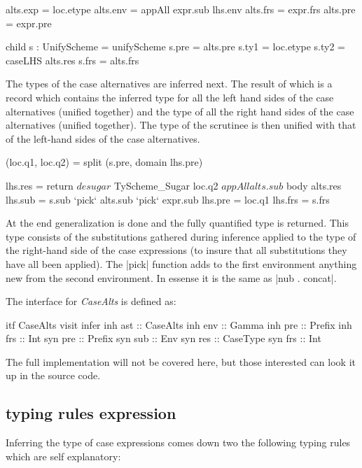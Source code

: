 \begin{code}
   alts.exp  = loc.etype
   alts.env  = appAll expr.sub lhs.env
   alts.frs  = expr.frs
   alts.pre  = expr.pre
   
   child s : UnifyScheme = unifyScheme
   s.pre  = alts.pre
   s.ty1  = loc.etype
   s.ty2  = caseLHS alts.res
   s.frs  = alts.frs
\end{code}

The types of the case alternatives are inferred next. The result of which is a record which contains the inferred type for all the left hand sides of the case alternatives (unified together) and the type of all the right hand sides of the case alternatives (unified together). The type of the scrutinee is then unified with that of the left-hand sides of the case alternatives.

\begin{code}       
   (loc.q1, loc.q2) = split (s.pre, domain lhs.pre)
   
   lhs.res = return  $ desugar 
                     $ TyScheme_Sugar loc.q2 
                     $ appAll alts.sub 
                     $ body alts.res
   lhs.sub  = s.sub `pick` alts.sub `pick` expr.sub
   lhs.pre  = loc.q1
   lhs.frs  = s.frs
\end{code}
At the end generalization is done and the fully quantified type is returned. This type consists of the substitutions gathered during inference applied to the type of the right-hand side of the case expressions (to insure that all substitutions they have all been applied). The |pick| function adds to the first environment anything new from the second environment. In essense it is the same as |nub . concat|.

The interface for \emph{CaseAlts} is defined as:
\begin{code}
itf CaseAlts
  visit infer
    inh ast  :: CaseAlts
    inh env  :: Gamma
    inh pre  :: Prefix
    inh frs  :: Int
    syn pre  :: Prefix
    syn sub  :: Env
    syn res  :: CaseType
    syn frs  :: Int 
\end{code}

The full implementation will not be covered here, but those interested can look it up in the source code.

\subsection{typing rules expression}
Inferring the type of case expressions comes down two the following typing rules which are self explanatory:

